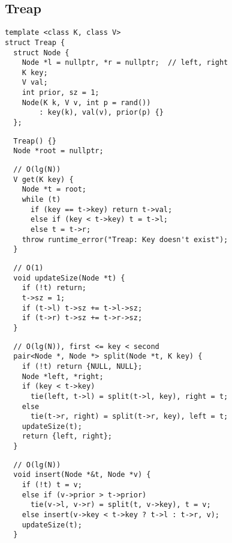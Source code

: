 \documentclass[twoside]{article}
\begin{document}
\begin{multicols*}{2}
\subsection*{Treap}
\begin{verbatim}
template <class K, class V>
struct Treap {
  struct Node {
    Node *l = nullptr, *r = nullptr;  // left, right
    K key;
    V val;
    int prior, sz = 1;
    Node(K k, V v, int p = rand())
        : key(k), val(v), prior(p) {}
  };
\end{verbatim}
\vspace{-12pt}
\begin{verbatim}
  Treap() {}
  Node *root = nullptr;
\end{verbatim}
\vspace{-12pt}
\begin{verbatim}
  // O(lg(N))
  V get(K key) {
    Node *t = root;
    while (t)
      if (key == t->key) return t->val;
      else if (key < t->key) t = t->l;
      else t = t->r;
    throw runtime_error("Treap: Key doesn't exist");
  }
\end{verbatim}
\vspace{-12pt}
\begin{verbatim}
  // O(1)
  void updateSize(Node *t) {
    if (!t) return;
    t->sz = 1;
    if (t->l) t->sz += t->l->sz;
    if (t->r) t->sz += t->r->sz;
  }
\end{verbatim}
\vspace{-12pt}
\begin{verbatim}
  // O(lg(N)), first <= key < second
  pair<Node *, Node *> split(Node *t, K key) {
    if (!t) return {NULL, NULL};
    Node *left, *right;
    if (key < t->key)
      tie(left, t->l) = split(t->l, key), right = t;
    else
      tie(t->r, right) = split(t->r, key), left = t;
    updateSize(t);
    return {left, right};
  }
\end{verbatim}
\vspace{-12pt}
\begin{verbatim}
  // O(lg(N))
  void insert(Node *&t, Node *v) {
    if (!t) t = v;
    else if (v->prior > t->prior)
      tie(v->l, v->r) = split(t, v->key), t = v;
    else insert(v->key < t->key ? t->l : t->r, v);
    updateSize(t);
  }
\end{verbatim}
\vspace{-12pt}
\begin{verbatim}

\end{verbatim}
\end{multicols*}
\end{document}
